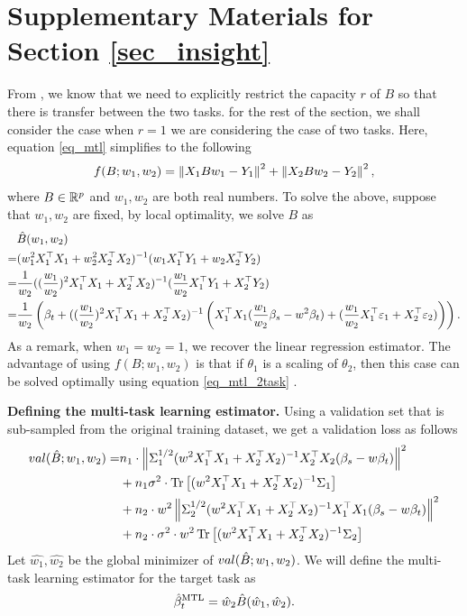 \section{Supplementary Materials for Section \ref{sec_insight}}

From \cite{WZR20}, we know that we need to explicitly restrict the capacity $r$ of $B$ so that there is transfer between the two tasks.
for the rest of the section, we shall consider the case when $r=1$ we are considering the case of two tasks.
Here, equation \eqref{eq_mtl} simplifies to the following
\begin{align}\label{eq_mtl_2task}
	f(B; w_1, w_2) = \left\| X_1 B w_1 - Y_1 \right\|^2 + \left\| X_2 B w_2 - Y_2 \right\|^2,
\end{align}
where $B\in\mathbb{R}^p$ and $w_1, w_2$ are both real numbers.
To solve the above, suppose that $w_1, w_2$ are fixed, by local optimality, we solve $B$ as
\begin{align*}
	& \hat{B}(w_1, w_2) \\
	=& (w_1^2 X_1^{\top}X_1 + w_2^2 X_2^{\top}X_2)^{-1} (w_1 X_1^{\top}Y_1 + w_2 X_2^{\top}Y_2) \\
	=& \frac{1}{w_2} ((\frac{w_1}{w_2})^2 X_1^{\top}X_1 + X_2^{\top}X_2)^{-1} (\frac{w_1}{w_2} X_1^{\top}Y_1 + X_2^{\top}Y_2) \\
	=& \frac{1}{w_2}\left({\beta_t + ((\frac{w_1}{w_2})^2 X_1^{\top}X_1 + X_2^{\top}X_2)^{-1}\left({X_1^{\top}X_1(\frac{w_1}{w_2}\beta_s - w^2\beta_t) + (\frac{w_1}{w_2} X_1^{\top}\varepsilon_1 + X_2^{\top}\varepsilon_2)}\right)}\right).
\end{align*}
As a remark, when $w_1 = w_2 = 1$, we recover the linear regression estimator.
The advantage of using $f(B; w_1, w_2)$ is that if $\theta_1$ is a scaling of $\theta_2$, then this case can be solved optimally using equation \eqref{eq_mtl_2task} \cite{KD12}.

\textbf{Defining the multi-task learning estimator.}
Using a validation set that is sub-sampled from the original training dataset, we get a validation loss as follows
\begin{align}
		val(\hat{B}; w_1, w_2)
	= & n_1 \cdot \left\| \Sigma_1^{1/2}(w^2 X_1^{\top}X_1 + X_2^{\top}X_2)^{-1}X_2^{\top}X_2(\beta_s - w\beta_t) \right\|^2 \nonumber \\
		&+ n_1 \sigma^2 \cdot \operatorname{Tr}\left[(w^2 X_1^{\top}X_1 + X_2^{\top}X_2)^{-1}\Sigma_1\right] \nonumber \\
		&+ n_2 \cdot w^2\left\| \Sigma_2^{1/2}(w^2 X_1^{\top}X_1 + X_2^{\top}X_2)^{-1}X_1^{\top}X_1(\beta_s - w\beta_t) \right\|^2 \nonumber \\
		&+ n_2 \cdot \sigma^2 \cdot w^2\operatorname{Tr}\left[(w^2 X_1^{\top}X_1 + X_2^{\top}X_2)^{-1}\Sigma_2\right] \label{eq_val_mtl}
\end{align}
Let $\hat{w_1}, \hat{w_2}$ be the global minimizer of $val(\hat{B}; w_1, w_2)$.
We will define the multi-task learning estimator for the target task as
	\[ \hat{\beta}_t^{\text{MTL}} = \hat{w}_{2}\hat{B}(\hat{w}_1, \hat{w}_2). \]

